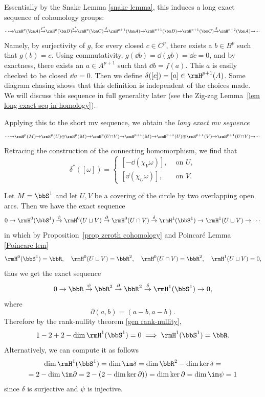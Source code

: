 Essentially by the Snake Lemma \ref{snake lemma}, this induces a long exact sequence of cohomology groups:
\[
\scriptstyle
\cdots\to \rmH^p(\bm A)\overset{f^\ast}\to \rmH^p(\bm B)\overset{g^\ast}\to \rmH^p(\bm C)\overset\delta\to \rmH^{p+1}(\bm A)\to \rmH^{p+1}(\bm B)\to \rmH^{p+1}(\bm C)\overset\delta\to \rmH^{p+2}(\bm A)\to \cdots
\]
Namely, by surjectivity of $g$, for every closed $c\in C^p$, there exists a $b\in B^p$ such that $g(b)=c$. Using commutativity,  $g(\dd b)=\dd (gb)=\dd c=0$, and by exactness, there exists an $a\in A^{p+1}$ such that $\dd b=f(a)$. This $a$ is easily checked to be closed $\dd a=0$. Then we define $\delta([c])=[a]\in \rmH^{p+1}(A)$. Some diagram chasing shows that this definition is independent of the choices made. We will discuss this sequence in full generality later (see the Zig-zag Lemma~\ref{lem long exact seq in homology}).

Applying this to the short \gls{mv} sequence, we obtain the \emph{long exact \gls{mv} sequence}
\[
\scriptstyle
\cdots\to \rmH^p(M)\to \rmH^p(U)\oplus \rmH^p(M)\to \rmH^p(U\cap V)\to \rmH^{p+1}(M)\to \rmH^{p+1}(U)\oplus \rmH^{p+1}(V)\to \rmH^{p+1}(U\cap V)\to \cdots
\]
Retracing the construction of the connecting homomorphism, we find that 
\[\delta^\ast([\omega])=
    \begin{cases}
        [-\dd (\chi_V \omega)],& \text{ on }U,\\
        [\dd (\chi_U \omega)],& \text{ on }V.
    \end{cases}
\]

\begin{example}\label{de Rham of circle}
    Let $M=\bbS^1$ and let $U,V$ be a covering of the circle by two overlapping open arcs. Then we have the exact sequence
    \[0\to \rmH^0(\bbS^1)\overset\psi\to \rmH^0(U\sqcup V)\overset\partial\to \rmH^0(U\cap V)\overset\delta\to \rmH^1(\bbS^1)\to \rmH^1(U\sqcup V)\to \cdots \]
    in which by Proposition~\ref{prop zeroth cohomology} and Poincar\'e Lemma \ref{Poincare lem}
    \[\rmH^0(\bbS^1)=\bbR,\quad \rmH^0(U\sqcup V)=\bbR^2,\quad \rmH^0(U\cap V)=\bbR^2,\quad \rmH^1(U\sqcup V)=0,\]
    thus we get the exact sequence
    \[0\to \bbR\overset\psi\to \bbR^2\overset{\partial}\to \bbR^2\overset\delta\to \rmH^1(\bbS^1)\to 0,\]
    where
    \[\partial(a,b)=(a-b,a-b).\]
    Therefore by the rank-nullity theorem \ref{gen rank-nullity},
    \[1-2+2-\dim \rmH^1(\bbS^1)=0\implies \rmH^1(\bbS^1)=\bbR.\]
    Alternatively, we can compute it as follows
    \begin{multline}
        \dim \rmH^1(\bbS^1)=\dim \im \delta=\dim \bbR^2-\dim\ker\delta=\\=2-\dim\im \partial=2-(2-\dim\ker\partial))=\dim\ker\partial=\dim\im\psi =1
    \end{multline}
    since $\delta$ is surjective and $\psi$ is injective.
\end{example}


